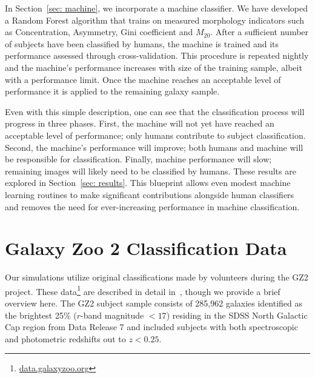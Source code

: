 \documentclass[twocolumn, trackchanges, linenumbers]{aastex6}%
\newcommand{\M}[1]{$M_{\mathrm{#1}}$}
\begin{document}
In Section~\ref{sec: machine}, we incorporate a machine classifier. We have 
developed a Random Forest algorithm that trains on measured morphology 
indicators such as Concentration, Asymmetry, Gini coefficient and 
\M{20}. After a sufficient number of subjects have been classified 
by humans,  the machine is trained and its performance assessed through 
cross-validation. This procedure is repeated nightly and the machine's performance 
increases with size of the training sample, albeit with a performance limit. 
Once the machine reaches an acceptable level of performance it is applied to the 
remaining galaxy sample. 


Even with this simple description, one can see that the classification process 
will progress in three phases.  First, the machine will not yet have reached an 
acceptable level of performance; only humans contribute to subject classification. 
Second, the machine's performance will improve; both humans and machine will 
be responsible for classification. Finally, machine performance will slow; 
remaining images will likely need to be classified by humans. These results are 
explored in  Section~\ref{sec: results}. This blueprint allows even modest 
machine learning routines to make significant contributions alongside human 
classifiers and removes the need for ever-increasing performance in machine classification.



\section{Galaxy Zoo 2 Classification Data} \label{sec: data}

Our simulations utilize original classifications made by volunteers during the
 GZ2 project. These data\footnote{\url{data.galaxyzoo.org}} are described in detail
 in~\cite{Willett2013}, though we provide a brief overview here.  The GZ2 subject sample
 consists of 285,962 galaxies identified as the brightest 25\% ($r$-band magnitude $< 17$)
 residing in the SDSS North Galactic Cap region from Data Release 7 and included 
subjects with both spectroscopic and photometric redshifts out to $z < 0.25$.
\end{document}
